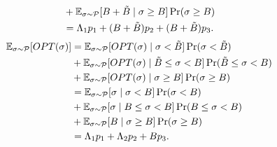 \documentclass[11pt]{article}
\begin{document}
\begin{enumerate}
\begin{align*}
        &+\mathbb{E}_{\sigma \sim \mathcal{P}}[B + \tilde B \mid \sigma \geq B]\Pr( \sigma \geq B) \\
        &= \Lambda_1 p_1 + (B + \tilde B)p_2 + (B + \tilde B)p_3.
    \end{align*}
    \begin{align*}
        \mathbb{E}_{\sigma \sim \mathcal{P}}[OPT(\sigma)] & = \mathbb{E}_{\sigma \sim \mathcal{P}}[OPT(\sigma)\mid \sigma < \tilde B]\Pr(\sigma < \tilde B) \\ 
        &+ \mathbb{E}_{\sigma \sim \mathcal{P}}[OPT(\sigma)\mid  \tilde B \leq \sigma < B]\Pr( \tilde B \leq \sigma < B) \\
        &+\mathbb{E}_{\sigma \sim \mathcal{P}}[OPT(\sigma)\mid \sigma \geq B]\Pr( \sigma \geq B) \\
        &=\mathbb{E}_{\sigma \sim \mathcal{P}}[ \sigma \mid \sigma < B]\Pr(\sigma < B) \\ 
        &+\mathbb{E}_{\sigma \sim \mathcal{P}}[\sigma \mid B \leq \sigma < B]\Pr( B\leq \sigma < B) \\
        &+\mathbb{E}_{\sigma \sim \mathcal{P}}[B \mid \sigma \geq B]\Pr( \sigma \geq B) \\
        &= \Lambda_1 p_1 + \Lambda_2 p_2 + Bp_3.
    \end{align*}


\end{enumerate}
\end{document}
